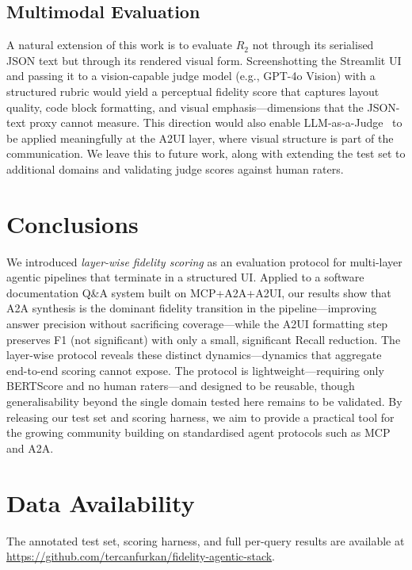 \documentclass[10pt,journal,compsoc]{IEEEtran}
\begin{document}
\subsection{Multimodal Evaluation}
\label{sec:multimodal}

A natural extension of this work is to evaluate $R_2$ not through its serialised
JSON text but through its rendered visual form. Screenshotting the Streamlit UI and
passing it to a vision-capable judge model (e.g., GPT-4o Vision) with a structured
rubric would yield a perceptual fidelity score that captures layout quality, code
block formatting, and visual emphasis---dimensions that the JSON-text proxy cannot
measure. This direction would also enable LLM-as-a-Judge~\cite{zheng2023llmjudge}
to be applied meaningfully at the A2UI layer, where visual structure is part of the
communication. We leave this to future work, along with extending the test set to
additional domains and validating judge scores against human raters.


\section{Conclusions}
\label{sec:conclusions}

We introduced \emph{layer-wise fidelity scoring} as an evaluation protocol for
multi-layer agentic pipelines that terminate in a structured UI. Applied to a
software documentation Q\&A system built on MCP+A2A+A2UI, our results show that
A2A synthesis is the dominant fidelity transition in the pipeline---improving
answer precision without sacrificing coverage---while the A2UI formatting step
preserves F1 (not significant) with only a small, significant Recall reduction.
The layer-wise protocol reveals these distinct dynamics---dynamics
that aggregate end-to-end scoring cannot expose. The protocol is
lightweight---requiring only BERTScore and no human raters---and designed to be
reusable, though generalisability beyond the single domain tested here remains
to be validated. By releasing our test set and scoring harness, we aim to
provide a practical tool for the growing community building on standardised agent
protocols such as MCP and A2A.


\section*{Data Availability}

The annotated test set, scoring harness, and full per-query results are available
at \url{https://github.com/tercanfurkan/fidelity-agentic-stack}.
\end{document}
